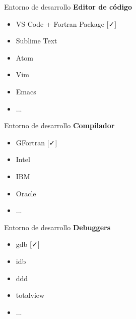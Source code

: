 \begin{frame}[fragile]{Entorno de desarrollo}
  \textbf{Editor de código}
  \begin{itemize}[<+(1)->]
    \item VS Code + Fortran Package [{\color{green-600}\faCheck}]
    \item Sublime Text
    \item Atom
    \item Vim
    \item Emacs
    \item ...
  \end{itemize}
\end{frame}
 

\begin{frame}[fragile]{Entorno de desarrollo}
  \textbf{Compilador}
  \begin{itemize}[<+(1)->]
    \item GFortran [{\color{green-600}\faCheck}]
    \item Intel
    \item IBM
    \item Oracle
    \item ...
  \end{itemize}
\end{frame}


\begin{frame}[fragile]{Entorno de desarrollo}
  \textbf{Debuggers}
  \begin{itemize}[<+(1)->]
    \item gdb [{\color{green-600}\faCheck}]
    \item idb
    \item ddd
    \item totalview
    \item ...
  \end{itemize}
\end{frame}
